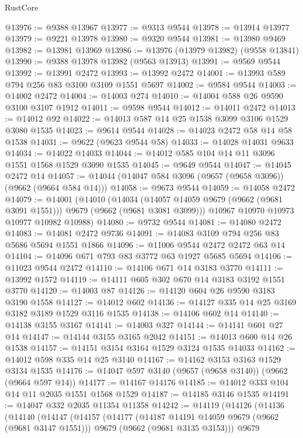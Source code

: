 \begin{lexlean}{RustCore}
\begin{coremodule}
@13976 := @9388 @13967
@13977 := @9313 @9544
@13978 := @13914 @13977
@13979 := @9221 @13978
@13980 := @9320 @9544
@13981 := @13980 @9469
@13982 := @13981 @13969
@13986 := @13976 (@13979 @13982) (@9558 @13841)
@13990 := @9388 @13978 @13982 (@9563 @13913)
@13991 := @9569 @9544
@13992 := @13991 @2472
@13993 := @13992 @2472
@14001 := @13993 @589 @794 @256 @83 @3100 @3109 @1551 @5697
@14002 := @9584 @9544
@14003 := @14002 @2472
@14004 := @14003 @274
@14010 := @14004 @588 @26 @9590 @3100 @3107 @1912
@14011 := @9598 @9544
@14012 := @14011 @2472
@14013 := @14012 @92
@14022 := @14013 @587 @14 @25 @1538 @3099 @3106 @1529 @3080 @1535
@14023 := @9614 @9544
@14028 := @14023 @2472 @58 @14 @58 @1538
@14031 := @9622 (@9623 @9544 @58)
@14033 := @14028 @14031 @9633
@14034 := @14022 @14033
@14044 := @14012 @585 @104 @14 @11 @3096 @1551 @1568 @1529 @3090 @1535
@14045 := @9649 @9544
@14047 := @14045 @2472 @14
@14057 := @14044 (@14047 @584 @3096 (@9657 (@9658 @3096)) (@9662 (@9664 @584 @14)))
@14058 := @9673 @9544
@14059 := @14058 @2472
@14079 := @14001
    (@14010
      (@14034 (@14057 @14059 @9679 (@9662 (@9681 @3091 @1551))) @9679 (@9662 (@9681 @3081 @3099)))
      @10967
      @10970
      @10973
      @10977
      @10982
      @10988)
@14080 := @9732 @9544
@14081 := @14080 @2472
@14083 := @14081 @2472 @9736
@14091 := @14083 @3109 @794 @256 @83 @5686 @5694 @1551 @1866
@14096 := @11006 @9544 @2472 @2472 @63 @14
@14104 := @14096 @671 @793 @83 @3772 @63 @1927 @5685 @5694
@14106 := @11023 @9544 @2472
@14110 := @14106 @671 @14 @3183 @3770
@14111 := @13992 @1572
@14119 := @14111 @605 @302 @670 @14 @3183 @3192 @1551 @3770
@14120 := @14003 @87
@14126 := @14120 @604 @26 @9590 @3183 @3190 @1558
@14127 := @14012 @602
@14136 := @14127 @335 @14 @25 @3169 @3182 @3189 @1529 @3116 @1535
@14138 := @14106 @602 @14
@14140 := @14138 @3155 @3167
@14141 := @14003 @327
@14144 := @14141 @601 @27 @14
@14147 := @14144 @3155 @3165 @2042
@14151 := @14013 @600 @14 @26 @1538
@14157 := @14151 @3154 @3164 @1529 @3124 @1535 @14033
@14162 := @14012 @598 @335 @14 @25 @3140
@14167 := @14162 @3153 @3163 @1529 @3134 @1535
@14176 := @14047 @597 @3140 (@9657 (@9658 @3140)) (@9662 (@9664 @597 @14))
@14177 := @14167 @14176
@14185 := @14012 @333 @104 @14 @11 @2035 @1551 @1568 @1529
@14187 := @14185 @3146 @1535
@14191 := @14047 @332 @2035 @11354 @11358
@14242 := @14119
    (@14126
      (@14136
        (@14140
          (@14147
            (@14157
              (@14177
                (@14187 @14191 @14059 @9679 (@9662 (@9681 @3147 @1551)))
                @9679
                (@9662 (@9681 @3135 @3153)))
              @9679

\end{coremodule}
\end{lexlean}
